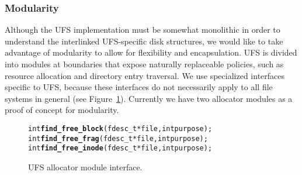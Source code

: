 \subsubsection {Modularity}
Although the UFS implementation must be somewhat monolithic in order to
understand the interlinked UFS-specific disk structures, we would like to take
advantage of modularity to allow for flexibility and encapsulation. UFS is
divided into modules at boundaries that expose naturally replaceable policies,
such as resource allocation and directory entry traversal. We use specialized
interfaces specific to UFS, because these interfaces do not necessarily apply
to all file systems in general (see Figure~\ref{fig:moduleinterface}).
Currently we have two allocator modules as a proof of concept for modularity.

\begin{figure}[htb]
\vspace{-0.5\baselineskip}
\begin{scriptsize}
\begin{alltt}
int \textbf{find_free_block}(fdesc_t * file, int purpose);
int \textbf{find_free_frag}(fdesc_t * file, int purpose);
int \textbf{find_free_inode}(fdesc_t * file, int purpose);
\end{alltt}
\end{scriptsize}
\vspace{-0.5\baselineskip}
\caption{\label{fig:moduleinterface} UFS allocator module interface.}
\end{figure}


